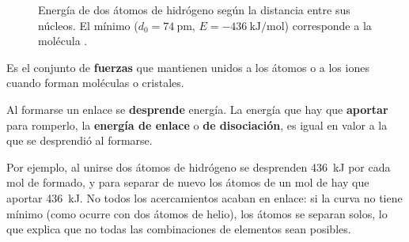 \begin{figure}[H]
    \centering
    \caption{Energía de dos átomos de hidrógeno según la distancia entre sus núcleos. El mínimo (\(d_0 = \qty{74}{\pico\m}\),
    \(E = \qty{-436}{\kilo\joule\per\mol}\)) corresponde a la molécula .}
    \label{fig:ud4-curva}
\end{figure}

\begin{definition}
    Es el conjunto de \textbf{fuerzas} que mantienen unidos a los átomos o a los iones cuando forman moléculas o cristales.

    Al formarse un enlace se \textbf{desprende} energía. La energía que hay que \textbf{aportar} para romperlo, la \textbf{energía
    de enlace} o \textbf{de disociación}, es igual en valor a la que se desprendió al formarse.
\end{definition}

Por ejemplo, al unirse dos átomos de hidrógeno se desprenden \qty{436}{\kilo\joule} por cada mol de  formado, y para
separar de nuevo los átomos de un mol de  hay que aportar \qty{436}{\kilo\joule}. No todos los acercamientos acaban en
enlace: si la curva no tiene mínimo (como ocurre con dos átomos de helio), los átomos se separan solos, lo que explica que no
todas las combinaciones de elementos sean posibles.

